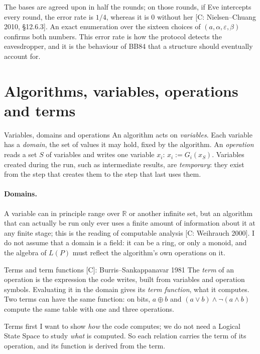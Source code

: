 \documentclass[11pt,a4paper]{article}
\newcommand{\gr}[1]{\textsf{[#1]}}
\begin{document}
The bases are agreed upon in half the rounds; on those rounds, if Eve intercepts every round, the error rate is $1/4$, whereas it is $0$ without her \gr{C: Nielsen--Chuang 2010, \S12.6.3}. An exact enumeration over the sixteen choices of $(a,\alpha,\varepsilon,\beta)$ confirms both numbers. This error rate is how the protocol detects the eavesdropper, and it is the behaviour of BB84 that a structure should eventually account for.

\section{Algorithms, variables, operations and terms}\label{sec:terms}

\begin{defn}{Variables, domains and operations}
An algorithm acts on \emph{variables}. Each variable has a \emph{domain}, the set of values it may hold, fixed by the algorithm. An \emph{operation} reads a set $S$ of variables and writes one variable $x_i$: $x_i:=G_i(x_S)$. Variables created during the run, such as intermediate results, are \emph{temporary}: they exist from the step that creates them to the step that last uses them.
\end{defn}

\paragraph{Domains.} A variable can in principle range over $\mathbb{R}$ or another infinite set, but an algorithm that can actually be run only ever uses a finite amount of information about it at any finite stage; this is the reading of computable analysis \gr{C: Weihrauch 2000}. I do not assume that a domain is a field: it can be a ring, or only a monoid, and the algebra of $L(P)$ must reflect the algorithm's own operations on it.

\begin{defn}{Terms and term functions \gr{C}: Burris--Sankappanavar 1981}
The \emph{term} of an operation is the expression the code writes, built from variables and operation symbols. Evaluating it in the domain gives its \emph{term function}, what it computes. Two terms can have the same function: on bits, $a\oplus b$ and $(a\vee b)\wedge\neg(a\wedge b)$ compute the same table with one and three operations.
\end{defn}

\begin{why}{Terms first}
I want to show \emph{how} the code computes; we do not need a Logical State Space to study \emph{what} is computed. So each relation carries the term of its operation, and its function is derived from the term.
\end{why}
\end{document}
